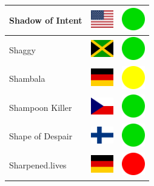 \documentclass[12pt, a4paper, twoside]{report}
\begin{document}
\begin{center}
\begin{longtable}{|p{5cm}|p{2cm}|p{2cm}|}
 Shadow of Intent                                           & \includegraphics[width=1cm]{../img/flags/us} &   \includegraphics[width=1cm]{../likes/y} \\ \hline
 Shaggy                                                     & \includegraphics[width=1cm]{../img/flags/jm} &   \includegraphics[width=1cm]{../likes/y} \\ \hline
 Shambala                                                   & \includegraphics[width=1cm]{../img/flags/de} &   \includegraphics[width=1cm]{../likes/m} \\ \hline
 Shampoon Killer                                            & \includegraphics[width=1cm]{../img/flags/cz} &   \includegraphics[width=1cm]{../likes/y} \\ \hline
 Shape of Despair                                           & \includegraphics[width=1cm]{../img/flags/fi} &   \includegraphics[width=1cm]{../likes/y} \\ \hline
 Sharpened.lives                                            & \includegraphics[width=1cm]{../img/flags/de} &   \includegraphics[width=1cm]{../likes/n} \\ \hline

\end{longtable}
\end{center}
\end{document}
